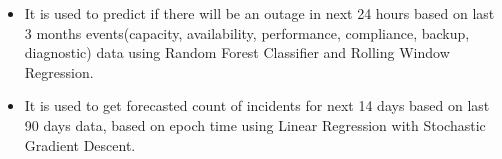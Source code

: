 \begin{itemize}
\item 
It is used to predict if there will be an outage in next 24 hours based on last 3 months events(capacity, availability, performance, compliance, backup, diagnostic) data using Random Forest Classifier and Rolling Window Regression.
\end{itemize}
\begin{itemize}
\item It is used to get forecasted count of incidents for next 14 days based on last 90 days data, based on epoch time using Linear Regression with Stochastic Gradient Descent.
\end{itemize}
\cvproject{}
